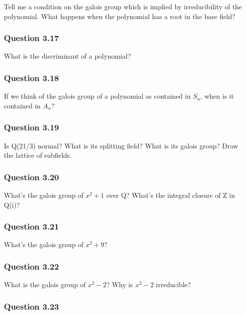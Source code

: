 Tell me a condition on the galois group which is implied by
irreducibility of the polynomial. What happens when the polynomial has a
root in the base field?

\hypertarget{question-3.17}{%
\subsubsection{Question 3.17}\label{question-3.17}}

What is the discriminant of a polynomial?

\hypertarget{question-3.18}{%
\subsubsection{Question 3.18}\label{question-3.18}}

If we think of the galois group of a polynomial as contained in \(S_n\),
when is it contained in \(A_n\)?

\hypertarget{question-3.19}{%
\subsubsection{Question 3.19}\label{question-3.19}}

Is Q(21/3) normal? What is its splitting field? What is its galois
group? Draw the lattice of subfields.

\hypertarget{question-3.20}{%
\subsubsection{Question 3.20}\label{question-3.20}}

What's the galois group of \(x^2 + 1\) over Q? What's the integral
closure of Z in Q(i)?

\hypertarget{question-3.21}{%
\subsubsection{Question 3.21}\label{question-3.21}}

What's the galois group of \(x^2 + 9\)?

\hypertarget{question-3.22}{%
\subsubsection{Question 3.22}\label{question-3.22}}

What is the galois group of \(x^2 - 2\)? Why is \(x^2 - 2\) irreducible?

\hypertarget{question-3.23}{%
\subsubsection{Question 3.23}\label{question-3.23}}

